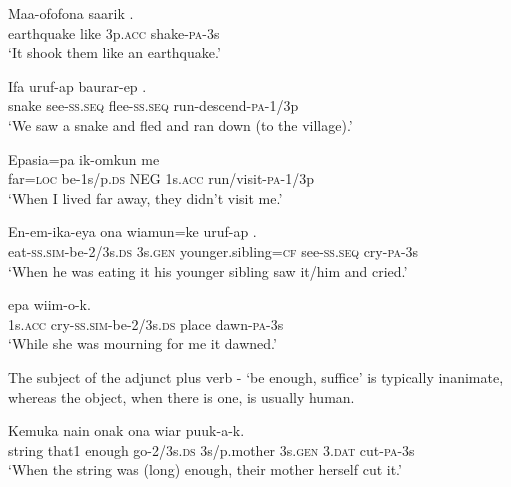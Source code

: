 \ea%
\label{ex:x1826}
\gll Maa-ofofona saarik  . \\
earthquake like 3p.\textsc{acc} shake-\textsc{pa}-3s\\
\glt`It shook them like an earthquake.'
\z

\ea%
\label{ex:x304}
\gll Ifa uruf-ap baurar-ep . \\
snake see-\textsc{ss}.\textsc{seq} flee-\textsc{ss}.\textsc{seq} run-descend-\textsc{pa}-1/3p \\
\glt`We saw a snake and fled and ran down (to the village).'
\z

\ea%
\label{ex:x305}
\gll Epasia=pa ik-omkun me   \\
far=\textsc{loc} be-1s/p.\textsc{ds} NEG 1s.\textsc{acc} run/visit-\textsc{pa}-1/3p\\
\glt`When I lived far away, they didn't visit me.'
\z

\ea%
\label{ex:x1059}
\gll En-em-ika-eya ona wiamun=ke uruf-ap .\\
eat-\textsc{ss}.\textsc{sim}-be-2/3s.\textsc{ds} 3s.\textsc{gen} younger.sibling=\textsc{cf} see-\textsc{ss}.\textsc{seq} cry-\textsc{pa}-3s\\
\glt`When he was eating it his younger sibling saw it/him and cried.'
\z

\ea%
\label{ex:x1060}
\gll {}  epa wiim-o-k. \\
1s.\textsc{acc} cry-\textsc{ss}.\textsc{sim}-be-2/3s.\textsc{ds} place dawn-\textsc{pa}-3s\\
\glt`While she was mourning for me it dawned.'
\z

The subject of the adjunct plus verb - `be enough, suffice' is typically inanimate, whereas the object, when there is one, is usually human. 

\ea%
\label{ex:x1058}
\gll Kemuka nain   onak ona wiar puuk-a-k.\\
string that1 enough go-2/3s.\textsc{ds} 3s/p.mother 3s.\textsc{gen} 3.\textsc{dat} cut-\textsc{pa}-3s\\
\glt`When the string was (long) enough, their mother herself cut it.'
\z

